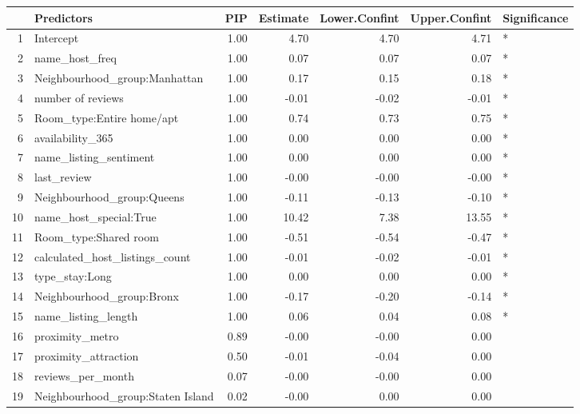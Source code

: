 \begin{table}[ht]
\centering
\begin{tabular}{rlrrrrl}
  \hline
 & Predictors & PIP & Estimate & Lower.Confint & Upper.Confint & Significance \\ 
  \hline
1 & Intercept & 1.00 & 4.70 & 4.70 & 4.71 & * \\ 
  2 & name\_host\_freq & 1.00 & 0.07 & 0.07 & 0.07 & * \\ 
  3 & Neighbourhood\_group:Manhattan & 1.00 & 0.17 & 0.15 & 0.18 & * \\ 
  4 & number of reviews & 1.00 & -0.01 & -0.02 & -0.01 & * \\ 
  5 & Room\_type:Entire home/apt & 1.00 & 0.74 & 0.73 & 0.75 & * \\ 
  6 & availability\_365 & 1.00 & 0.00 & 0.00 & 0.00 & * \\ 
  7 & name\_listing\_sentiment & 1.00 & 0.00 & 0.00 & 0.00 & * \\ 
  8 & last\_review & 1.00 & -0.00 & -0.00 & -0.00 & * \\ 
  9 & Neighbourhood\_group:Queens & 1.00 & -0.11 & -0.13 & -0.10 & * \\ 
  10 & name\_host\_special:True & 1.00 & 10.42 & 7.38 & 13.55 & * \\ 
  11 & Room\_type:Shared room & 1.00 & -0.51 & -0.54 & -0.47 & * \\ 
  12 & calculated\_host\_listings\_count & 1.00 & -0.01 & -0.02 & -0.01 & * \\ 
  13 & type\_stay:Long & 1.00 & 0.00 & 0.00 & 0.00 & * \\ 
  14 & Neighbourhood\_group:Bronx & 1.00 & -0.17 & -0.20 & -0.14 & * \\ 
  15 & name\_listing\_length & 1.00 & 0.06 & 0.04 & 0.08 & * \\ 
  16 & proximity\_metro & 0.89 & -0.00 & -0.00 & 0.00 &  \\ 
  17 & proximity\_attraction & 0.50 & -0.01 & -0.04 & 0.00 &  \\ 
  18 & reviews\_per\_month & 0.07 & -0.00 & -0.00 & 0.00 &  \\ 
  19 & Neighbourhood\_group:Staten Island & 0.02 & -0.00 & 0.00 & 0.00 &  \\ 
   \hline
\end{tabular}
\end{table}
